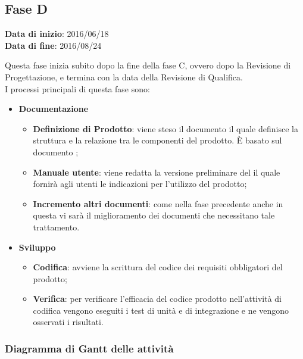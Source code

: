 	\subsection{Fase D}
	\begin{center}
		\textbf{Data di inizio}: 2016/06/18 \\
		\textbf{Data di fine}: 2016/08/24 \\
	\end{center}
	Questa fase inizia subito dopo la fine della fase C, ovvero dopo la Revisione di Progettazione, e termina con la data della Revisione di Qualifica. \\
	I processi principali di questa fase sono: 
		\begin{itemize}
			\item \textbf{Documentazione} 
			\att
			\begin{itemize} %
				\item \textbf{Definizione di Prodotto}: viene steso il documento \DPdocRQ il quale definisce la struttura e la relazione tra le componenti del prodotto. È basato sul documento \STdocRQ;
				\item \textbf{Manuale utente}: viene redatta la versione preliminare del \MUdocRQ il quale fornirà agli utenti le indicazioni per l'utilizzo del prodotto;
				\item \textbf{Incremento altri documenti}: come nella fase precedente anche in questa vi sarà il miglioramento dei documenti che necessitano tale trattamento.
			\end{itemize}
			\item \textbf{Sviluppo}
			\att
			\begin{itemize}
				\item \textbf{Codifica}: avviene la scrittura del codice dei requisiti obbligatori del prodotto;
				\item \textbf{Verifica}: per verificare l'efficacia del codice prodotto nell'attività di codifica vengono eseguiti i test di unità e di integrazione e ne vengono osservati i risultati. 
			\end{itemize}
		\end{itemize}
		\subsubsection{Diagramma di Gantt delle attività}
		
